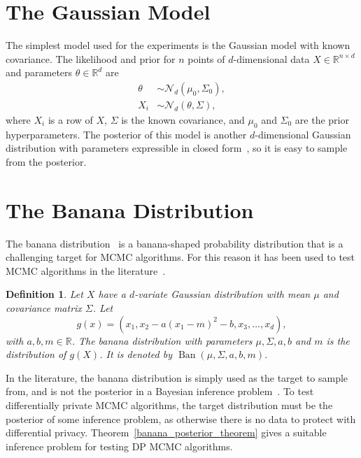 \documentclass[english,twoside,openright]{HYgraduMLDS}
\newtheorem{definition}{Definition}
\newcommand{\R}{\mathbb{R}}
\newcommand{\caln}{{\mathcal{N}}}
\DeclareMathOperator{\ban}{Ban}
\begin{document}
\section{The Gaussian Model}\label{gauss_model}

The simplest model used for the experiments is the Gaussian model with
known covariance. The likelihood and prior for \(n\) points of \(d\)-dimensional
data \(X \in \R^{n\times d}\) and parameters \(\theta\in \R^{d}\) are
\begin{align*}
  \theta &\sim \caln_{d}(\mu_{0}, \Sigma_{0}), \\
  X_{i} &\sim \caln_{d}(\theta, \Sigma),
\end{align*}
where \(X_{i}\) is a row of \(X\), \(\Sigma\) is the known covariance,
and \(\mu_{0}\) and \(\Sigma_{0}\) are the prior hyperparameters.
The posterior of this model is another \(d\)-dimensional Gaussian distribution
with parameters expressible in closed form~\cite[Section 3.5]{BDA},
so it is easy to sample from the posterior.

\section{The Banana Distribution}\label{banana_section}

The banana distribution~\cite{TPK14} is a banana-shaped probability
distribution that is a challenging target for MCMC algorithms. For this reason it has
been used to test MCMC algorithms in the literature~\cite{TPK14}.

\begin{definition}
    Let \(X\) have a \(d\)-variate Gaussian distribution with
    mean \(\mu\) and covariance matrix \(\Sigma\). Let
    \[
        g(x) = (x_1, x_2 - a(x_1 - m)^2 - b, x_3, \dotsc, x_d),
    \]
    with \(a, b, m \in \R\).
    The banana distribution with parameters \(\mu, \Sigma, a, b\) and \(m\)
    is the distribution of \(g(X)\). It is denoted by
    \(\ban(\mu, \Sigma, a, b, m)\).
\end{definition}

In the literature, the banana distribution is simply used as the target to
sample from, and is not the posterior in a Bayesian inference
problem~\cite{TPK14}. To test differentially private MCMC algorithms, the
target distribution must be the posterior of some inference problem, as
otherwise there is no data to protect with differential privacy.
Theorem~\ref{banana_posterior_theorem} gives a suitable inference problem
for testing DP MCMC algorithms.
\end{document}
